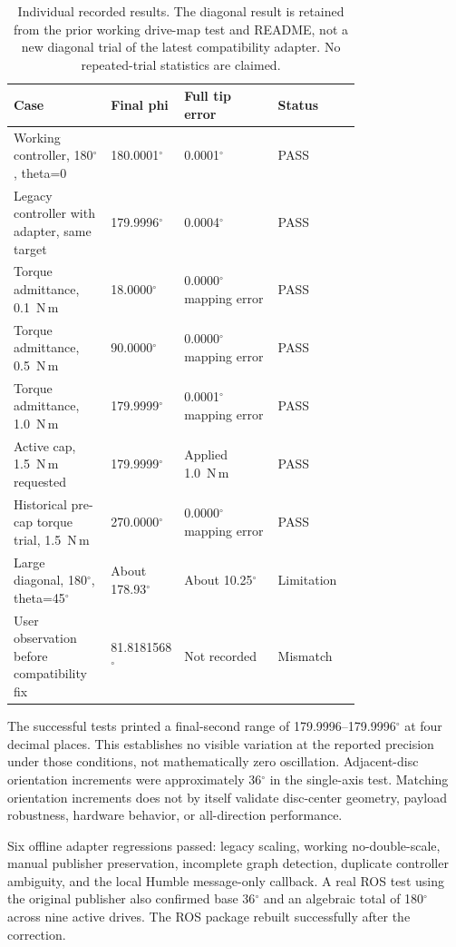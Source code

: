 \documentclass[11pt,letterpaper]{article}
\newcommand{\degrees}{\ensuremath{^{\circ}}}
\begin{document}
\begin{table}[htbp]
\centering
\begin{tabular}{p{0.29\linewidth}p{0.20\linewidth}p{0.27\linewidth}l}
\toprule
Case & Final phi & Full tip error & Status\\\midrule
Working controller, 180\degrees{}, theta=0 & 180.0001\degrees{} & 0.0001\degrees{} & PASS\\
Legacy controller with adapter, same target & 179.9996\degrees{} & 0.0004\degrees{} & PASS\\
Torque admittance, 0.1~N\,m & 18.0000\degrees{} & 0.0000\degrees{} mapping error & PASS\\
Torque admittance, 0.5~N\,m & 90.0000\degrees{} & 0.0000\degrees{} mapping error & PASS\\
Torque admittance, 1.0~N\,m & 179.9999\degrees{} & 0.0001\degrees{} mapping error & PASS\\
Active cap, 1.5~N\,m requested & 179.9999\degrees{} & Applied 1.0~N\,m & PASS\\
Historical pre-cap torque trial, 1.5~N\,m & 270.0000\degrees{} & 0.0000\degrees{} mapping error & PASS\\
Large diagonal, 180\degrees{}, theta=45\degrees{} & About 178.93\degrees{} & About 10.25\degrees{} & Limitation\\
User observation before compatibility fix & 81.8181568\degrees{} & Not recorded & Mismatch\\
\bottomrule
\end{tabular}
\caption{Individual recorded results. The diagonal result is retained from
the prior working drive-map test and README, not a new diagonal trial of the
latest compatibility adapter. No repeated-trial statistics are claimed.}
\end{table}

The successful tests printed a final-second range of
179.9996--179.9996\degrees{} at four decimal places. This establishes no
visible variation at the reported precision under those conditions, not
mathematically zero oscillation. Adjacent-disc orientation increments were
approximately 36\degrees{} in the single-axis test. Matching orientation
increments does not by itself validate disc-center geometry, payload
robustness, hardware behavior, or all-direction performance.

Six offline adapter regressions passed: legacy scaling, working no-double-scale,
manual publisher preservation, incomplete graph detection, duplicate controller
ambiguity, and the local Humble message-only callback. A real ROS test using
the original publisher also confirmed base 36\degrees{} and an algebraic
total of 180\degrees{} across nine active drives. The ROS package rebuilt
successfully after the correction.
\end{document}
